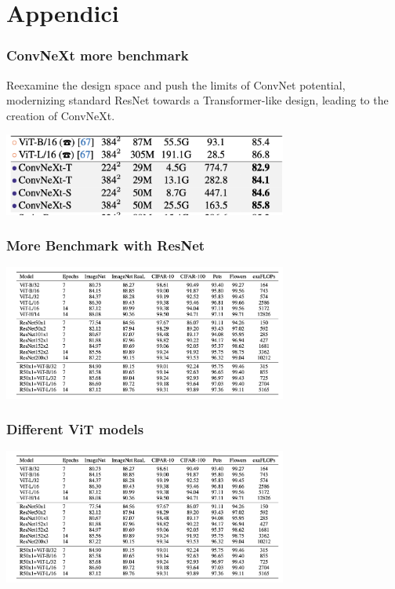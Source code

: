\section{Appendici}

\begin{frame}
\frametitle{ConvNeXt more benchmark}
Reexamine the design space and push the limits of ConvNet potential, modernizing  standard ResNet towards a Transformer-like design, leading to the creation of ConvNeXt.

\begin{center}
    \includegraphics[width=0.7\textwidth]{img/4-section/ConvNext2.png}
\end{center}

\end{frame}


\begin{frame}
\frametitle{More Benchmark with ResNet}
\begin{center}
    \includegraphics[width=0.7\textwidth]{img/4-section/More-benchmark.png}
\end{center}

\end{frame}

\begin{frame}
    \frametitle{Different ViT models}
    \begin{center}
        \includegraphics[width=0.7\textwidth]{img/4-section/More-benchmark.png}
    \end{center}
    
    \end{frame}